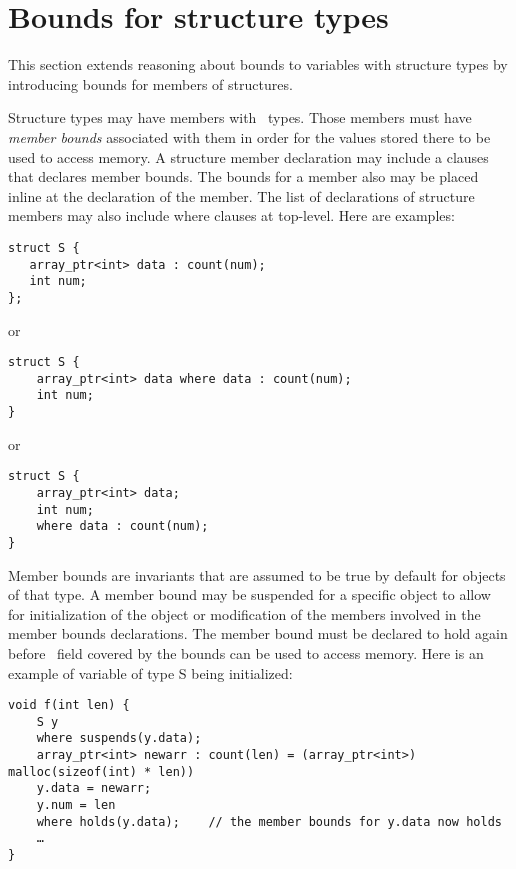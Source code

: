 
\chapter{Bounds for structure types}
\label{chapter:structure-bounds}

This section extends reasoning about bounds to variables with structure
types by introducing bounds for members of structures.

Structure types may have members with \arrayptr\ types. Those
members must have \emph{member bounds} associated with them in order for
the values stored there to be used to access memory. A structure member
declaration may include a  clauses that declares member
bounds. The bounds for a member also may be placed inline at the
declaration of the member. The list of declarations of structure members
may also include where clauses at top-level. Here are examples:

\begin{verbatim}
struct S {
   array_ptr<int> data : count(num);
   int num;
};
\end{verbatim}

or

\begin{verbatim}
struct S {
    array_ptr<int> data where data : count(num);
    int num;
}
\end{verbatim}

or

\begin{verbatim}
struct S {
    array_ptr<int> data;
    int num;
    where data : count(num);
}
\end{verbatim}

Member bounds are invariants that are assumed to be true by default for
objects of that type. A member bound may be suspended for a specific
object to allow for initialization of the object or modification of the
members involved in the member bounds declarations. The member bound
must be declared to hold again before \arrayptr\ field covered
by the bounds can be used to access memory. Here is an example of
variable of type S being initialized:

\begin{verbatim}
void f(int len) {
    S y 
    where suspends(y.data);
    array_ptr<int> newarr : count(len) = (array_ptr<int>) malloc(sizeof(int) * len))
    y.data = newarr;
    y.num = len
    where holds(y.data);    // the member bounds for y.data now holds
    …
}
\end{verbatim}


